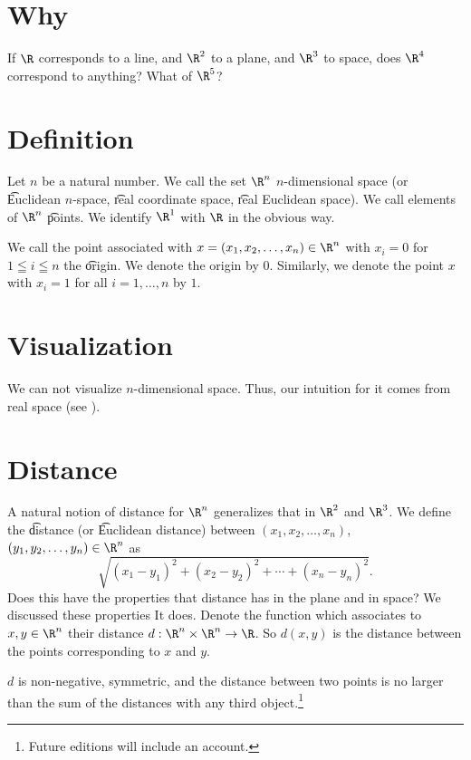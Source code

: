 
\section*{Why}

If $\R $ corresponds to a line, and $\R ^2$ to a plane, and $\R ^3$ to space, does $\R ^4$ correspond to anything? What of $\R ^5$?

\section*{Definition}

Let $n$ be a natural number.
We call the set $\R ^n$ \t{$n$-dimensional space} (or \t{Euclidean $n$-space}, \t{real coordinate space}, \t{real Euclidean space}).
We call elements of $\R ^n$ \t{points}.
We identify $\R ^1$ with $\R $ in the obvious way.

We call the point associated with $x = (x_1, x_2, \dots , x_n) \in \R ^n$ with $x_i = 0$ for $1 \leqq i \leqq n$ the \t{origin}.
We denote the origin by $0$.
Similarly, we denote the point $x$ with $x_i = 1$ for all $i = 1, \dots , n$ by $1$.

\section*{Visualization}

We can not visualize $n$-dimensional space.
Thus, our intuition for it comes from real space (see ).

\section*{Distance}

A natural notion of distance for $\R ^n$ generalizes that in $\R ^2$ and $\R ^3$.
We define the \t{distance} (or \t{Euclidean distance}) between $(x_1, x_2, \dots , x_n)$, $(y_1, y_2, \dots , y_n) \in \R ^n$ as
\[
\sqrt{(x_1 - y_1)^2 + (x_2 - y_2)^2 + \cdots + (x_n - y_n)^2}.
\]
Does this have the properties that distance has in the plane and in space?
We discussed these properties
It does.
Denote the function which associates to $x, y \in \R ^n$ their distance $d: \R ^n \times  \R ^n \to \R $.
So $d(x, y)$ is the distance between the points corresponding to $x$ and $y$.

\begin{proposition}
$d$ is non-negative, symmetric, and the distance between two points is no larger than the sum of the distances with any third object.\footnote{Future editions will include an account.}
\end{proposition}

